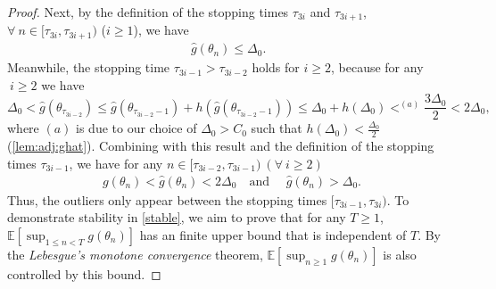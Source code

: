 \documentclass[standalone]{article}
\begin{document}
\begin{proof}
Next, by the definition of the stopping times $\tau_{3i}$ and $\tau_{3i+1}$, $\forall\ n \in [\tau_{3i}, \tau_{3i+1})$ ($i \geq 1$), we have
\begin{align}\label{fab_2}
\hat{g}(\theta_{n}) \leq \Delta_0.\ \,\, 
\end{align}
Meanwhile, the stopping time $\tau_{3i-1} > \tau_{3i-2}$  holds for $i\ge 2$, because for any $\ i\ge 2$ we have
\[
\Delta_{0} < \hat{g}(\theta_{\tau_{3i-2}}) \le \hat{g}(\theta_{\tau_{3i-2}-1}) + h(\hat{g}(\theta_{\tau_{3i-2}-1})) \le \Delta_{0} + h(\Delta_{0}) \mathop{<}^{(a)} \frac{3\Delta_{0}}{2} < 2\Delta_{0},
\]
where $(a)$ is due to our choice of $\Delta_{0} > C_{0}$ such that $h(\Delta_{0}) < \frac{\Delta_{0}}{2}$ (\cref{lem:adj:ghat}). Combining with this result and the definition of the stopping times $\tau_{3i-1}$, we have for any $n \in [\tau_{3i-2}, \tau_{3i-1})\ (\forall\ i\ge 2)$
\begin{align}\label{fabulous}
g(\theta_{n}) < \hat{g}(\theta_{n}) < 2\Delta_{0}\quad  \text{and }  \quad \hat{g}(\theta_{n}) > \Delta_0.
\end{align}
Thus, the outliers only appear between the stopping times \([ \tau_{3i-1}, \tau_{3i})\). To demonstrate stability in \cref{stable}, we aim to prove that  for any \(T \geq 1\),   \(\mathbb{E}\left[\sup_{1 \le n <T} g(\theta_{n}) \right]\) has an finite upper bound that is independent of \(T\). By the \emph{Lebesgue's monotone convergence} theorem, \(\mathbb{E}\left[\sup_{n \ge 1} g(\theta_{n}) \right]\) is also controlled by this bound. 



\end{proof}
\end{document}
